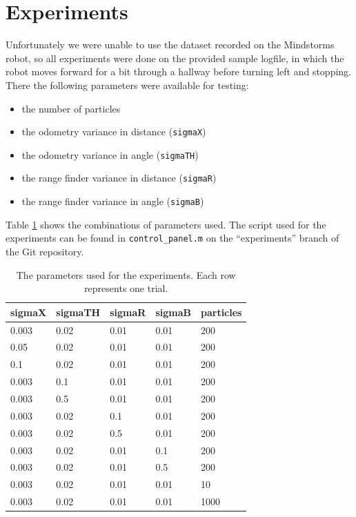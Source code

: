 \documentclass[a4paper, 20pt]{article}
\begin{document}
\section{Experiments}
Unfortunately we were unable to use the dataset recorded on the Mindstorms
robot, so all experiments were done on the provided sample logfile, in which the
robot moves forward for a bit through a hallway before turning left and
stopping. There the following parameters were available for testing:
\begin{itemize}
    \item the number of particles
    \item the odometry variance in distance (\texttt{sigmaX})
    \item the odometry variance in angle (\texttt{sigmaTH})
    \item the range finder variance in distance (\texttt{sigmaR})
    \item the range finder variance in angle (\texttt{sigmaB})
\end{itemize}

Table \ref{tbl:params} shows the combinations of parameters used.
The script used for the experiments can be found in \texttt{control\_panel.m} on
the ``experiments'' branch of the Git repository.

\begin{table}[htbp]
    \begin{tabular}{|l|l|l|l|l|}
    \hline
    sigmaX & sigmaTH & sigmaR & sigmaB & particles \\
    \hline
    0.003  & 0.02    & 0.01   & 0.01   & 200       \\
    0.05   & 0.02    & 0.01   & 0.01   & 200       \\
    0.1    & 0.02    & 0.01   & 0.01   & 200       \\
    0.003  & 0.1     & 0.01   & 0.01   & 200       \\
    0.003  & 0.5     & 0.01   & 0.01   & 200       \\
    0.003  & 0.02    & 0.1    & 0.01   & 200       \\
    0.003  & 0.02    & 0.5    & 0.01   & 200       \\
    0.003  & 0.02    & 0.01   & 0.1    & 200       \\
    0.003  & 0.02    & 0.01   & 0.5    & 200       \\
    0.003  & 0.02    & 0.01   & 0.01   & 10        \\
    0.003  & 0.02    & 0.01   & 0.01   & 1000      \\
    \hline
    \end{tabular}
    \caption{The parameters used for the experiments. Each row represents one
    trial.}
    \label{tbl:params}
\end{table}
\end{document}
